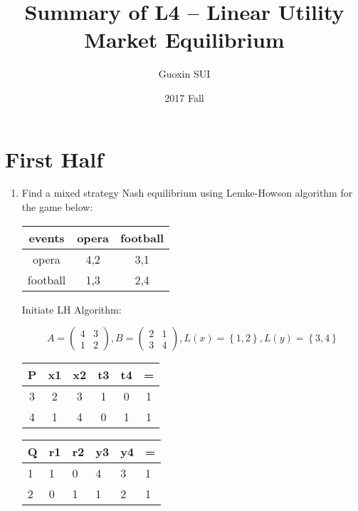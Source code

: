 \documentclass{article}
\title{Summary of L4 -- Linear Utility Market Equilibrium}
\author{Guoxin SUI}
\date{2017 Fall}
\newenvironment{answer}{\par\color{ForestGreen}}{\par}
\begin{document}
\maketitle

\section{First Half}

\begin{enumerate}
    \item
    Find a mixed strategy Nash equilibrium using Lemke-Howson algorithm for the game below:
    \begin{table}[h!]
      \centering
      \begin{tabular}[t]{ccc}
        \toprule
        events & opera & football \\
        \midrule
        opera & 4,2 & 3,1 \\
        \hline
        football & 1,3 & 2,4 \\
        \bottomrule
     \end{tabular}
   \end{table}
\begin{answer}
    Initiate LH Algorithm:

    $$A = \begin{pmatrix}
          4 & 3 \\
          1 & 2
        \end{pmatrix},
    B = \begin{pmatrix}
          2 & 1 \\
          3 & 4
        \end{pmatrix}, L(x)=\left\{1,2\right\}, L(y)=\left\{3,4\right\}$$
\begin{table}[!htb]
  \begin{answer}
\begin{minipage}[t]{.5\textwidth}
\centering
    \begin{tabular}[t]{cccccc}
      \toprule
      P & x1 & x2 & t3 & t4 & = \\
      \midrule
      3 & 2 & 3 & 1 & 0 & 1 \\
      \hline
      4 & 1 & 4 & 0 & 1 & 1 \\
      \bottomrule
    \end{tabular}
\end{minipage}
\begin{minipage}[t]{0.5\textwidth}
\centering
    \begin{tabular}[t]{llllll}
      \toprule
      Q & r1 & r2 & y3 & y4 & = \\
      \midrule
      1 & 1 & 0 & 4 & 3 & 1 \\
      \hline
      2 & 0 & 1 & 1 & 2 & 1 \\
      \bottomrule
    \end{tabular}
\end{minipage}
\end{answer}
\end{table}


\end{answer}
\end{enumerate}
\end{document}
